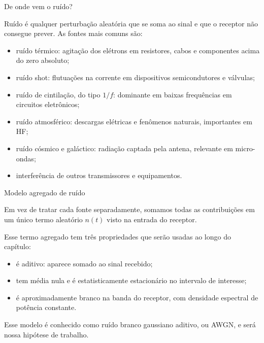 \begin{frame}{De onde vem o ruído?}

Ruído é qualquer perturbação aleatória que se soma ao sinal e que o receptor não consegue prever. As fontes mais comuns são:

\begin{itemize}
\item ruído térmico: agitação dos elétrons em resistores, cabos e componentes acima do zero absoluto;
\item ruído shot: flutuações na corrente em dispositivos semicondutores e válvulas;
\item ruído de cintilação, do tipo $1/f$: dominante em baixas frequências em circuitos eletrônicos;
\item ruído atmosférico: descargas elétricas e fenômenos naturais, importantes em HF;
\item ruído cósmico e galáctico: radiação captada pela antena, relevante em micro-ondas;
\item interferência de outros transmissores e equipamentos.
\end{itemize}

\end{frame}


\begin{frame}{Modelo agregado de ruído}

Em vez de tratar cada fonte separadamente, somamos todas as contribuições em um único termo aleatório $n(t)$ visto na entrada do receptor.

\vspace{0.3cm}

Esse termo agregado tem três propriedades que serão usadas ao longo do capítulo:

\begin{itemize}
\item é aditivo: aparece somado ao sinal recebido;
\item tem média nula e é estatisticamente estacionário no intervalo de interesse;
\item é aproximadamente branco na banda do receptor, com densidade espectral de potência constante.
\end{itemize}

\vspace{0.3cm}

Esse modelo é conhecido como ruído branco gaussiano aditivo, ou AWGN, e será nossa hipótese de trabalho.

\end{frame}

